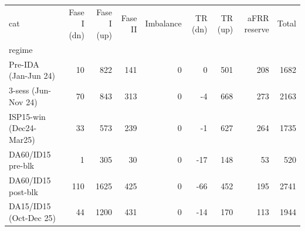 \begin{tabular}{lrrrrrrrr}
\toprule
cat & Fase I (dn) & Fase I (up) & Fase II & Imbalance & TR (dn) & TR (up) & aFRR reserve & Total \\
regime &  &  &  &  &  &  &  &  \\
\midrule
Pre-IDA (Jan-Jun 24) & 10 & 822 & 141 & 0 & 0 & 501 & 208 & 1682 \\
3-sess (Jun-Nov 24) & 70 & 843 & 313 & 0 & -4 & 668 & 273 & 2163 \\
ISP15-win (Dec24-Mar25) & 33 & 573 & 239 & 0 & -1 & 627 & 264 & 1735 \\
DA60/ID15 pre-blk & 1 & 305 & 30 & 0 & -17 & 148 & 53 & 520 \\
DA60/ID15 post-blk & 110 & 1625 & 425 & 0 & -66 & 452 & 195 & 2741 \\
DA15/ID15 (Oct-Dec 25) & 44 & 1200 & 431 & 0 & -14 & 170 & 113 & 1944 \\
\bottomrule
\end{tabular}
